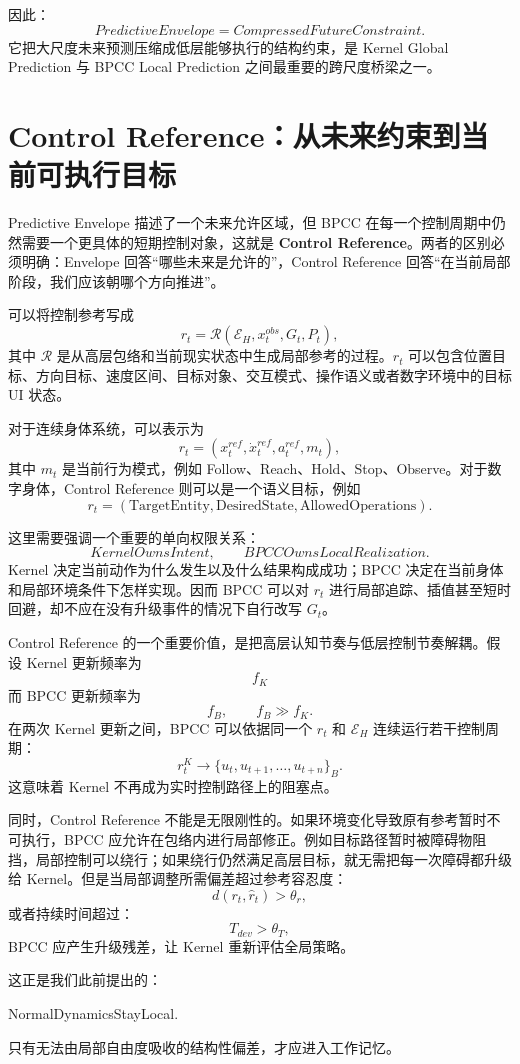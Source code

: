 因此：
\[
\boxed{
PredictiveEnvelope
=
CompressedFutureConstraint.
}
\]
它把大尺度未来预测压缩成低层能够执行的结构约束，是 Kernel Global Prediction 与 BPCC Local Prediction 之间最重要的跨尺度桥梁之一。

\section{Control Reference：从未来约束到当前可执行目标}

Predictive Envelope 描述了一个未来允许区域，但 BPCC 在每一个控制周期中仍然需要一个更具体的短期控制对象，这就是 \textbf{Control Reference}。两者的区别必须明确：Envelope 回答“哪些未来是允许的”，Control Reference 回答“在当前局部阶段，我们应该朝哪个方向推进”。

可以将控制参考写成
\[
r_t
=
\mathcal R
\left(
\mathcal E_H,
x_t^{obs},
G_t,
P_t
\right),
\]
其中 $\mathcal R$ 是从高层包络和当前现实状态中生成局部参考的过程。$r_t$ 可以包含位置目标、方向目标、速度区间、目标对象、交互模式、操作语义或者数字环境中的目标 UI 状态。

对于连续身体系统，可以表示为
\[
r_t=
(
x_t^{ref},
\dot x_t^{ref},
a_t^{ref},
m_t
),
\]
其中 $m_t$ 是当前行为模式，例如 Follow、Reach、Hold、Stop、Observe。对于数字身体，Control Reference 则可以是一个语义目标，例如
\[
r_t=
(\text{TargetEntity},
\text{DesiredState},
\text{AllowedOperations}).
\]

这里需要强调一个重要的单向权限关系：
\[
\boxed{
KernelOwnsIntent,
\qquad
BPCCOwnsLocalRealization.
}
\]
Kernel 决定当前动作为什么发生以及什么结果构成成功；BPCC 决定在当前身体和局部环境条件下怎样实现。因而 BPCC 可以对 $r_t$ 进行局部追踪、插值甚至短时回避，却不应在没有升级事件的情况下自行改写 $G_t$。

Control Reference 的一个重要价值，是把高层认知节奏与低层控制节奏解耦。假设 Kernel 更新频率为
\[
f_K
\]
而 BPCC 更新频率为
\[
f_B,
\qquad
f_B\gg f_K.
\]
在两次 Kernel 更新之间，BPCC 可以依据同一个 $r_t$ 和 $\mathcal E_H$ 连续运行若干控制周期：
\[
r_{t}^{K}
\rightarrow
\{u_t,u_{t+1},\ldots,u_{t+n}\}_B.
\]
这意味着 Kernel 不再成为实时控制路径上的阻塞点。

同时，Control Reference 不能是无限刚性的。如果环境变化导致原有参考暂时不可执行，BPCC 应允许在包络内进行局部修正。例如目标路径暂时被障碍物阻挡，局部控制可以绕行；如果绕行仍然满足高层目标，就无需把每一次障碍都升级给 Kernel。但是当局部调整所需偏差超过参考容忍度：
\[
d(r_t,\hat r_t)>\theta_r,
\]
或者持续时间超过：
\[
T_{dev}>\theta_T,
\]
BPCC 应产生升级残差，让 Kernel 重新评估全局策略。

这正是我们此前提出的：
\begin{statementbox}
NormalDynamicsStayLocal.
\end{statementbox}
只有无法由局部自由度吸收的结构性偏差，才应进入工作记忆。


